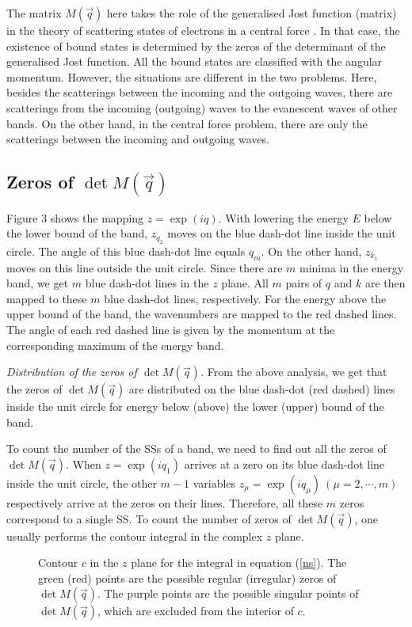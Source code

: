 \documentclass[aps,pra,amsmath,twocolumn,showpacs,bibnotes,10pt]{revtex4-1}
\begin{document}
The matrix $M(\vec q)$ here takes the role of the generalised Jost function (matrix) in the theory of scattering states of electrons in a central force \cite{Levinson,Newton}. In that case, the existence of bound states is determined by the zeros of the determinant of the generalised Jost function. All the bound states are classified with the angular momentum. However, the situations are different in the two problems. Here, besides the scatterings between the incoming and the outgoing waves, there are scatterings from the incoming (outgoing) waves to the evanescent waves of other bands. On the other hand, in the central force problem, there are only the scatterings between the incoming and outgoing waves.

\subsection{Zeros of $\det M(\vec q)$}

Figure 3 shows the mapping $z = \exp(iq)$. With lowering the energy $E$ below the lower bound of the band, $z_{q_2}$ moves on the blue dash-dot line inside the unit circle. The angle of this blue dash-dot line equals $q_m$. On the other hand, $z_{k_1}$ moves on this line outside the unit circle. Since there are $m$ minima in the energy band, we get $m$ blue dash-dot lines in the $z$ plane. All $m$ pairs of $q$ and $k$ are then mapped to these $m$ blue dash-dot lines, respectively. For the energy above the upper bound of the band, the wavenumbers are mapped to the red dashed lines. The angle of each red dashed line is given by the momentum at the corresponding maximum of the energy band.

{\it Distribution of the zeros of $\det M(\vec q)$.} From the above analysis, we get that the zeros of $\det M(\vec q)$ are distributed on the blue dash-dot (red dashed) lines inside the unit circle for energy below (above) the lower (upper) bound of the band.

To count the number of the SSs of a band, we need to find out all the zeros of $\det M(\vec q)$. When $z = \exp(iq_1)$ arrives at a zero on its blue dash-dot line inside the unit circle, the other $m-1$ variables $z_{\mu}=\exp(iq_{\mu})~(\mu = 2,\cdots,m)$ respectively arrive at the zeros on their lines. Therefore, all these $m$ zeros correspond to a single SS. To count the number of zeros of $\det M(\vec q)$, one usually performs the contour integral in the complex $z$ plane. 

\begin{figure}[t]
\centerline{}
\caption{Contour $c$ in the $z$ plane for the integral in equation (\ref{ns}). The green (red) points are the possible regular (irregular) zeros of $\det M(\vec q)$. The purple points are the possible singular points of $\det M(\vec q)$, which are excluded from the interior of $c$.} 
\end{figure}
\end{document}
